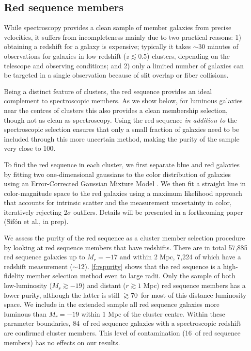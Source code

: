 \subsection{Red sequence members}\label{s:photmembers}

While spectroscopy provides a clean sample of member galaxies from precise velocities, it suffers 
from incompleteness mainly due to two practical reasons: 1) obtaining a redshift for a galaxy is 
expensive; typically it takes $\sim\!30$ minutes of observations for galaxies in low-redshift 
($z\lesssim0.5$) clusters, depending on the telescope and observing conditions; and 2) only a 
limited number of galaxies can be targeted in a single observation because of slit overlap or fiber 
collisions.

Being a distinct feature of clusters, the red sequence provides an ideal complement to 
spectroscopic members. As we show below, for luminous galaxies near the centres of clusters this 
also provides a clean membership selection, though not as clean as spectroscopy. Using the red 
sequence {\it in addition to} the spectroscopic selection ensures that only a small fraction of 
galaxies need to be included through this more uncertain method, making the purity of the sample 
very close to 100\percent.

To find the red sequence in each cluster, we first separate blue and red galaxies by fitting two 
one-dimensional gaussians to the color distribution of galaxies using an Error-Corrected Gaussian 
Mixture Model \citep[ECGMM,][]{hao09}. We then fit a straight line in color-magnitude space to the 
red galaxies using a maximum likelihood approach that accounts for intrinsic scatter and the 
measurement uncertainty in color, iteratively rejecting $2\sigma$ outliers. Details will be 
presented in a forthcoming paper (Sif\'on et al., in prep).

We assess the purity of the red sequence as a cluster member selection procedure by looking at red 
sequence members that have redshifts. There are in total 57,885 red sequence galaxies up to 
$M_r=-17$ and within 2 Mpc, 7,224 of which have a redshift measurement ($\sim$12\percent). 
\cref{f:rspurity} shows that the red sequence is a high-fidelity member selection method even to 
large radii. Only the sample of both low-luminosity ($M_r\gtrsim-19$) and distant ($r\gtrsim1$ Mpc) 
red sequence members has a lower purity, although the latter is still $\gtrsim70$\percent\ for most of 
this distance-luminosity space. We include in the extended sample all red sequence galaxies more 
luminous than $M_r=-19$ within 1 Mpc of the cluster centre. Within these parameter boundaries, 84\percent\ 
of red sequence galaxies with a spectroscopic redshift are confirmed cluster members. This level of 
contamination (16\percent\ of red sequence members) has no effects on our results.


